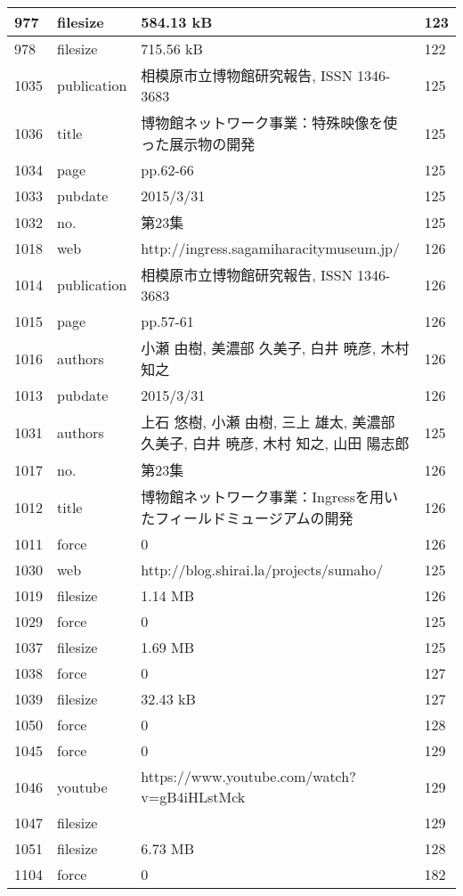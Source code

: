 \begin{longtable}{|l|l|l|l|}
977 & filesize & 584.13 kB & 123 \\ \hline 
978 & filesize & 715.56 kB & 122 \\ \hline 
1035 & publication & 相模原市立博物館研究報告, ISSN 1346-3683 & 125 \\ \hline 
1036 & title & 博物館ネットワーク事業：特殊映像を使った展示物の開発 & 125 \\ \hline 
1034 & page & pp.62-66 & 125 \\ \hline 
1033 & pubdate & 2015/3/31 & 125 \\ \hline 
1032 & no. & 第23集 & 125 \\ \hline 
1018 & web & http://ingress.sagamiharacitymuseum.jp/ & 126 \\ \hline 
1014 & publication & 相模原市立博物館研究報告, ISSN 1346-3683 & 126 \\ \hline 
1015 & page & pp.57-61 & 126 \\ \hline 
1016 & authors & 小瀬 由樹, 美濃部 久美子, 白井 暁彦, 木村 知之 & 126 \\ \hline 
1013 & pubdate & 2015/3/31 & 126 \\ \hline 
1031 & authors & 上石 悠樹, 小瀬 由樹, 三上 雄太, 美濃部 久美子, 白井 暁彦, 木村 知之, 山田 陽志郎 & 125 \\ \hline 
1017 & no. & 第23集 & 126 \\ \hline 
1012 & title & 博物館ネットワーク事業：Ingressを用いたフィールドミュージアムの開発 & 126 \\ \hline 
1011 & force & 0 & 126 \\ \hline 
1030 & web & http://blog.shirai.la/projects/sumaho/ & 125 \\ \hline 
1019 & filesize & 1.14 MB & 126 \\ \hline 
1029 & force & 0 & 125 \\ \hline 
1037 & filesize & 1.69 MB & 125 \\ \hline 
1038 & force & 0 & 127 \\ \hline 
1039 & filesize & 32.43 kB & 127 \\ \hline 
1050 & force & 0 & 128 \\ \hline 
1045 & force & 0 & 129 \\ \hline 
1046 & youtube & https://www.youtube.com/watch?v=gB4iHLstMck & 129 \\ \hline 
1047 & filesize &  & 129 \\ \hline 
1051 & filesize & 6.73 MB & 128 \\ \hline 
1104 & force & 0 & 182 \\ \hline 

\end{longtable}
